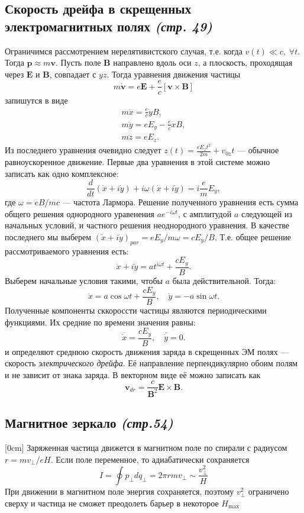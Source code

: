 \documentclass[a4paper,12pt]{article}
\begin{document}
\subsection{Скорость дрейфа в скрещенных электромагнитных полях \emph{(стр. 49)}}
Ограничимся рассмотрением нерелятивистского случая, т.\:е. когда
$v(t) \ll c,\; \forall t$. Тогда $\mathbf{p}\approx m \mathbf{v}$. Пусть поле
$\mathbf{B}$ направлено вдоль оси $z$, а плоскость, проходящая через  $\mathbf{E}$ и
$\mathbf{B}$, совпадает с $yz$. Тогда уравнения движения частицы
 \[
	 m \dot{\mathbf{v}}=e \mathbf{E}+\frac{e}{c}\left[ \mathbf{v}\times \mathbf{B} \right] 
\] 
запишутся в виде
\begin{gather*}
	m  \ddot{x}= \frac{e}{c} \dot{y} B,\\
	m \ddot{y} = e E_y- \frac{e}{c} \dot{x} B,\\
	m \ddot{z}=e E_z
.\end{gather*} 
Из последнего уравнения очевидно следует $z(t)= \frac{e E_z t^2}{2m}+v_{0z}t$ ---
обычное равноускоренное движение. Первые два уравнения в этой системе можно
записать как одно комплексное:
\[
	\frac{d}{dt}\left( \dot{x}+i \dot{y} \right) + i\omega \left( 
	\dot{x}+i \dot{y} \right) =i \frac{e}{m}E_y,
\] 
где $\omega = e B / mc$ --- частота Лармора. Решение полученного уравнения есть
сумма общего решения однородного уравенения  $a e ^{-i\omega t}$, с амплитудой
$a$ следующей из начальных условий, и частного решения неоднородного уравнения.
В качестве последнего мы выберем $\left( \dot{x} + i \dot{y} \right)_{par}=
e E_y / m \omega= c E_y /B$. Т.\:е. общее решение  рассмотриваемого уравнения
есть:
\[
	\dot{x}+i \dot{y}= a t ^{i \omega t} + \frac{c E_y}{B}
.\]
Выберем начальные условия такими, чтобы $a$ была действительной. Тогда:
 \[
	 \dot{x}= a \cos \omega t+ \frac{c  E_y}{B},\quad \dot{y}=-a \sin \omega t
.\] 
Полученные компоненты  сккороссти частицы являются периодическими функциями. Их
средние по времени значения равны:
\[
	\overline{\dot{x}}=\frac{c E_y}{B}, \quad \overline{\dot{y}}=0
.\]
и определяют среднюю скорость движения заряда в скрещенных ЭМ полях ---  скорость
\emph{электрического дрейфа}. Её направление перпендикулярно обоим полям и
не зависит от знака заряда. В векторном виде её можно записать как
\[
	\mathbf{v}_{dr}=\frac{c}{\mathbf{B}^2}\mathbf{E}\times\mathbf{B}
.\] 
\subsection{Магнитное зеркало \emph{(стр.54)}}
[0cm]
Заряженная частица движется в магнитном поле по спирали с радиусом
$r=mv_{\bot}/eH$. Если поле переменное, то адиабатически сохраняется 
\[I=\oint p_{\bot} dq_{\bot}=2\pi r m v_{\bot}\sim \frac{v_{\bot}^2}{H}\]
При движении в магнитном поле энергия сохраняется, поэтому $v_{\bot}^2$
ограничено сверху и частица не сможет преодолеть барьер в некоторое $H_{\max}$
\end{document}
